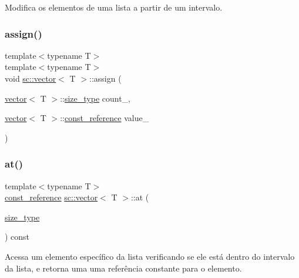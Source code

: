 Modifica os elementos de uma lista a partir de um intervalo. 

\mbox{\label{classsc_1_1vector_a70d7074754cd062c66a968f5d3b5ad2a}} 
\subsubsection{\texorpdfstring{assign()}{assign()}\hspace{0.1cm}{\footnotesize\ttfamily [4/4]}}
{\footnotesize\ttfamily template$<$typename T$>$ \\
template$<$typename T$>$ \\
void \hyperlink{classsc_1_1vector}{sc\+::vector}$<$ T $>$\+::assign (\begin{DoxyParamCaption}\item[{\hyperlink{classsc_1_1vector}{vector}$<$ T $>$\+::\hyperlink{classsc_1_1vector_a48bf37ba1a6d0c13504414d86e27c399}{size\+\_\+type}}]{count\+\_\+,  }\item[{\hyperlink{classsc_1_1vector}{vector}$<$ T $>$\+::\hyperlink{classsc_1_1vector_a8da2b1a11b069241100f9b2e14f481a0}{const\+\_\+reference}}]{value\+\_\+ }\end{DoxyParamCaption})}

\mbox{\label{classsc_1_1vector_aad1a99cfd4cbd7fe58bfb6439d78c8db}} 
\subsubsection{\texorpdfstring{at()}{at()}\hspace{0.1cm}{\footnotesize\ttfamily [1/2]}}
{\footnotesize\ttfamily template$<$typename T$>$ \\
\hyperlink{classsc_1_1vector_a8da2b1a11b069241100f9b2e14f481a0}{const\+\_\+reference} \hyperlink{classsc_1_1vector}{sc\+::vector}$<$ T $>$\+::at (\begin{DoxyParamCaption}\item[{\hyperlink{classsc_1_1vector_a48bf37ba1a6d0c13504414d86e27c399}{size\+\_\+type}}]{ }\end{DoxyParamCaption}) const}



Acessa um elemento específico da lista verificando se ele está dentro do intervalo da lista, e retorna uma uma referência constante para o elemento. 

